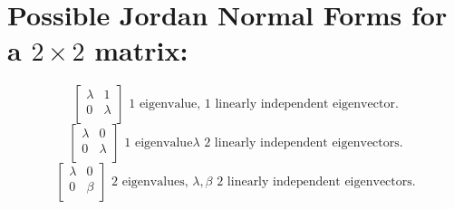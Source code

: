 \documentclass{report}
\begin{document}
  \section{Possible Jordan Normal Forms for a $ 2 \times  2$ matrix:}
  \[
  \begin{bmatrix}
  \lambda & 1\\
  0 & \lambda\\
  \end{bmatrix} \text{ 1 eigenvalue, 1 linearly independent eigenvector}
  .\] 
  \[
  \begin{bmatrix}
  \lambda & 0\\
  0 & \lambda\\
  \end{bmatrix} \text{ 1 eigenvalue} \lambda \text{ 2 linearly independent eigenvectors}
  .\] 
  \[
  \begin{bmatrix}
  \lambda & 0\\
  0 & \beta\\
  \end{bmatrix}  \text{ 2 eigenvalues, } \lambda , \beta  \text{ 2 linearly independent eigenvectors}
  .\] 
\end{document}
